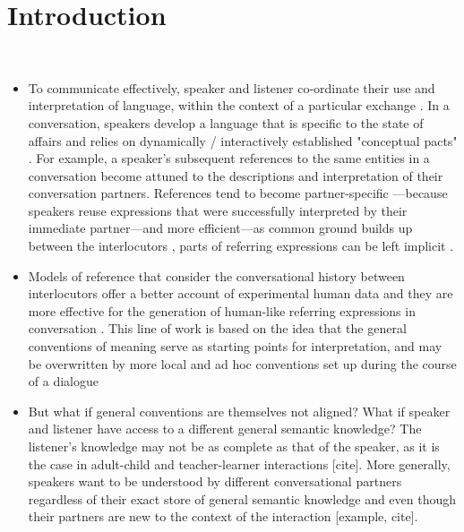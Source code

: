 
\section{Introduction}
\label{sec:intro}

\\

\begin{itemize}
\item To communicate effectively, speaker and listener co-ordinate their use and interpretation of language, within the context of a particular exchange \cite{GarrodAnderson1987}.  In a conversation, speakers develop a language that is specific to the state of affairs and relies on dynamically / interactively established "conceptual pacts" \cite{GarrodAnderson1987,BrennanClark1996}. For example, a speaker's subsequent references \cite{mcdonald-1978-subsequent-reference} to the same entities in a conversation become attuned to the descriptions and interpretation of their conversation partners. References tend to become partner-specific \cite{BrennanClark1996,metzing2003conceptual,brennan2009partner}---because speakers reuse expressions that were successfully interpreted by their immediate partner---and more efficient---as common ground builds up between the interlocutors \cite{stalnaker2002common}, parts of referring expressions can be left implicit \cite{Grice75,ClarkWilkes-Gibbs1986,clark1991grounding,Clark1996}. 

\item Models of reference that consider the conversational history between interlocutors offer a better account of experimental human data \cite{BrennanClark1996,hawkins2020characterizing} and they are more effective for the generation of human-like referring expressions in conversation \cite{takmaz-etal-2020-refer,hawkins2020continual}. This line of work is based on the idea that the general conventions of meaning serve as starting points for interpretation, and may be overwritten by more local and ad hoc conventions set up during the course of a dialogue \cite{GarrodAnderson1987,ClarkWilkes-Gibbs1986}

\item But what if general conventions are themselves not aligned? What if speaker and listener have access to a different general semantic knowledge?  The listener's knowledge may not be as complete as that of the speaker, as it is the case in adult-child and teacher-learner interactions [cite]. More generally, speakers want to be understood by different conversational partners regardless of their exact store of general semantic knowledge and even though their partners are new to the context of the interaction [example, cite].


\end{itemize}
